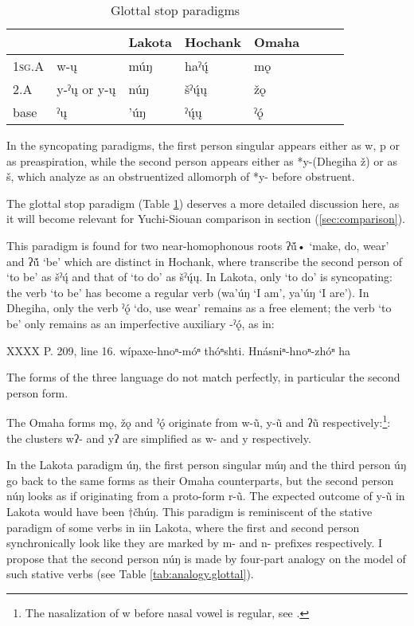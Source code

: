 \documentclass[oneside,a4paper,11pt]{article}
\newcommand{\ipa}[1]{{\phon#1}} %
\begin{document}
\begin{table}[H]
\caption{Glottal stop paradigms} \label{tab:glottal} \centering
\begin{tabular}{llllllll}
\toprule
 & 	 & 	Lakota & 	Hochank & 	Omaha & \\
 \midrule
\textsc{1sg.A} & 	\ipa{*w-ų}   & 	\ipa{múŋ} & 	\ipa{haˀų́} & 	\ipa{mǫ} & \\
2.A & 	\ipa{*y-ˀų} or 	\ipa{*y-ų}  & 	\ipa{núŋ} & 	\ipa{šˀų́ų} & 	\ipa{žǫ} &\\ 
base & 	\ipa{*ˀų} & 	\ipa{'úŋ} & 	\ipa{ˀų́ų} & 	\ipa{ˀǫ́} & \\
\bottomrule
\end{tabular}
\end{table}

In the syncopating paradigms, the first person singular appears either as \ipa{*w}, \ipa{*p} or as preaspiration, while the second person appears either as *\ipa{y-}(Dhegiha \ipa{ž}) or as \ipa{š}, which \citet{rankin15csd} analyze as an obstruentized allomorph of *\ipa{y-} before obstruent.


The glottal stop paradigm (Table \ref{tab:glottal}) deserves a more detailed discussion here, as it will become relevant for Yuchi-Siouan comparison in section (\ref{sec:comparison}).

This paradigm is found for two near-homophonous roots \ipa{*ʔṹ•}  `make, do, wear' and \ipa{*ʔṹ}  `be' which are distinct in Hochank, where \citet{helmbrecht06hocak} transcribe the second person of `to be' as \ipa{šˀų́} and that of `to do' as \ipa{šˀų́ų}. In Lakota, only `to do' is syncopating: the verb `to be' has become a regular verb (\ipa{wa'úŋ} `I am', \ipa{ya'úŋ} `I are'). In Dhegiha, only the verb \ipa{ˀǫ́} `do, use wear' remains as a free element; the verb `to be' only remains as an imperfective auxiliary \ipa{-ˀǫ́}, as in:

XXXX \citealt[484]{rankin05quapaw}
P. 209, line 16.
wípaxe-hnoⁿ-móⁿ thóⁿshti. Hnásniⁿ-hnoⁿ-zhóⁿ ha

The forms of the three language do not match perfectly, in particular the second person form. 

The Omaha forms \ipa{mǫ}, \ipa{žǫ} and \ipa{ˀǫ́} originate from \ipa{*w-ũ}, \ipa{*y-ũ} and \ipa{*ʔũ} respectively:\footnote{The nasalization of \ipa{*w} before nasal vowel is regular, see \citet{michaud-jacques12nasalite}.}: the clusters \ipa{*wʔ-} and \ipa{*yʔ} are simplified as \ipa{*w-} and \ipa{*y} respectively.

In the Lakota paradigm \ipa{úŋ}, the first person singular \ipa{múŋ} and the third person \ipa{úŋ} go back to the same forms as their Omaha counterparts, but the second person \ipa{núŋ} looks as if originating from a proto-form \ipa{*r-ũ}. The expected outcome of \ipa{*y-ũ} in Lakota would have been $\dagger$\ipa{čhúŋ}. This paradigm is reminiscent of the stative paradigm of some verbs in \ipa{i}in Lakota, where the first and second person synchronically look like they are marked by \ipa{m-} and \ipa{n-} prefixes respectively. I propose that the second person \ipa{núŋ} is made by four-part analogy on the model of such stative verbs (see Table \ref{tab:analogy.glottal}).
\end{document}
